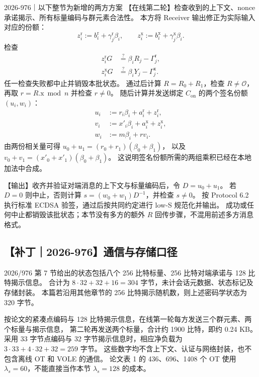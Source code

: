 \begin{patchnote}{2026-976｜以下整节为新增的两方方案}
【在线第二轮】检查收到的上下文、nonce 承诺揭示、所有标量编码与群元素合法性。
本方将 Receiver 输出修正为实际输入对应的份额：
\begin{equation}\label{eq:orch:2p-shift}
z_i^{\mathrm r}:=b_i^{\mathrm r}+\gamma_j^{\mathrm r}\beta_i,
\qquad
z_i^{\mathrm x}:=b_i^{\mathrm x}+\gamma_j^{\mathrm x}\beta_i.
\end{equation}
检查
\begin{equation}\label{eq:orch:2p-check}
\begin{aligned}
z_i^{\mathrm r}G&\stackrel?=\beta_iR_j-\Gamma_j^{\mathrm r},\\
z_i^{\mathrm x}G&\stackrel?=\beta_iY_j-\Gamma_j^{\mathrm x}.
\end{aligned}
\end{equation}
任一检查失败都中止并销毁本批状态。
通过后计算 $R=R_0+R_1$，检查 $R\ne\mathcal O$，再取 $r=R.\mathrm{x}\bmod n$ 并检查 $r\ne0$。
随后计算并发送绑定 $C_{\mathrm{on}}$ 的两个签名份额 $(u_i,w_i)$：
\begin{equation}\label{eq:orch:2p-sign-shares}
\begin{aligned}
u_i&:=r_i\beta_i+a_i^{\mathrm r}+z_i^{\mathrm r},\\
v_i&:=x'_i\beta_i+a_i^{\mathrm x}+z_i^{\mathrm x},\\
w_i&:=m\beta_i+rv_i.
\end{aligned}
\end{equation}
由两份相关量可得 $u_0+u_1=(r_0+r_1)(\beta_0+\beta_1)$，
以及 $v_0+v_1=(x'_0+x'_1)(\beta_0+\beta_1)$。
这说明签名份额所需的两组乘积已经在本地加法中合成。

【输出】收齐并验证对端消息的上下文与标量编码后，令 $D=u_0+u_1$。
若 $D=0$ 则中止，否则计算 $s=(w_0+w_1)D^{-1}$，并检查 $s\ne0$。
按 Protocol 6.2 执行标准 ECDSA 验签，通过后按共同约定进行 low-S 规范化并输出。
成功或任何中止都销毁该批状态；本节没有多方的额外 $R$ 回传步骤，不混用前述多方消息格式。

\subsection{【补丁｜2026-976】通信与存储口径}

2026/976 第 7 节给出的状态包括八个 256 比特标量、256 比特对端承诺与 128 比特揭示信息。
合计为 $8\cdot32+32+16=304$ 字节，未计会话元数据、状态标记及存储封装。
本篇若沿用其他章节的 256 比特揭示随机数，则上述密码学状态为 320 字节。

按论文的紧凑点编码与 128 比特揭示信息，在线第一轮每方发送三个群元素、两个标量与揭示信息，
第二轮再发送两个标量，合计约 1900 比特，即约 0.24 KB。
采用 33 字节点编码与 32 字节揭示信息时，相应净负载为 $3\cdot33+4\cdot32+32=259$ 字节。
这些数字均不含上下文、认证与网络封装，也不包含离线 OT 和 VOLE 的通信。
论文表 1 的 436、696、1408 个 OT 使用 $\lambda_s=60$，不能直接当作本节 $\lambda_s=128$ 的成本。
\end{patchnote}
